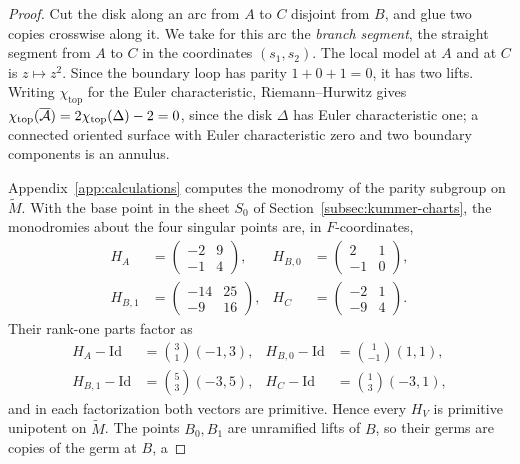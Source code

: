 \begin{proof}
Cut the disk along an arc from $A$ to $C$ disjoint from $B$, and glue two
copies crosswise along it.  We take for this arc the \emph{branch segment},
the straight segment from $A$ to $C$ in the coordinates $(s_1,s_2)$.  The
local model at $A$ and at $C$ is $z\mapsto z^2$.  Since the boundary loop has parity $1+0+1=0$, it has two lifts.
Writing $\chi_{\mathrm{top}}$ for the Euler characteristic, Riemann--Hurwitz
gives $\chi_{\mathrm{top}}(\overline{\mathcal A})=2\chi_{\mathrm{top}}(\Delta)-2=0$,
since the disk $\Delta$ has Euler characteristic one; a connected oriented
surface with Euler characteristic zero and two boundary components is an
annulus.

Appendix~\ref{app:calculations} computes the monodromy of the parity
subgroup on $\widetilde M$.  With the base point in the sheet $S_0$ of
Section~\ref{subsec:kummer-charts}, the monodromies about the four singular
points are, in $F$-coordinates,
\begin{equation}\label{eq:lifted-monodromies}
\begin{aligned}
 H_A&=\begin{pmatrix}-2&9\\-1&4\end{pmatrix},&
 H_{B,0}&=\begin{pmatrix}2&1\\-1&0\end{pmatrix},\\
 H_{B,1}&=\begin{pmatrix}-14&25\\-9&16\end{pmatrix},&
 H_C&=\begin{pmatrix}-2&1\\-9&4\end{pmatrix}.
\end{aligned}
\end{equation}
Their rank-one parts factor as
\begin{equation}\label{eq:primitive-factorizations}
\begin{aligned}
 H_A-\mathrm{Id}&=\binom31(-1,3),&
 H_{B,0}-\mathrm{Id}&=\binom{1}{-1}(1,1),\\
 H_{B,1}-\mathrm{Id}&=\binom53(-3,5),&
 H_C-\mathrm{Id}&=\binom13(-3,1),
\end{aligned}
\end{equation}
and in each factorization both vectors are primitive.  Hence every
$H_V$ is primitive unipotent on $\widetilde M$.  The points $B_0,B_1$ are
unramified lifts of $B$, so their germs are copies of the germ at $B$, a

\end{proof}
